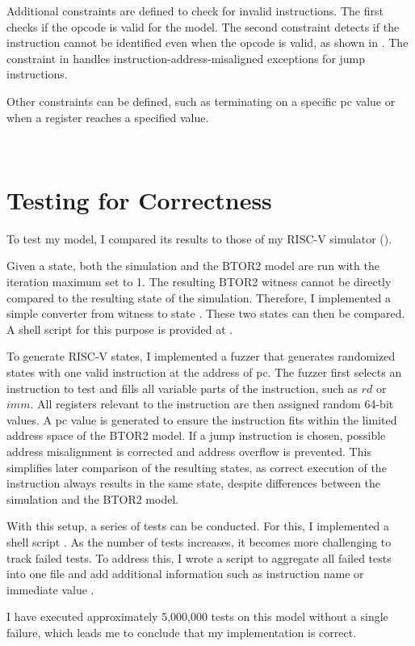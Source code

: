 Additional constraints are defined to check for invalid instructions.
The first checks if the opcode is valid for the model. The second
constraint detects if the instruction cannot be identified even when
the opcode is valid, as shown in . The
constraint in  handles
instruction-address-misaligned exceptions for jump instructions.

Other constraints can be defined, such as terminating on a specific
pc value or when a register reaches a specified value.

\\ 





\section{Testing for Correctness}\label{sec:corectness}
To test my model, I compared its results to those of my RISC-V
simulator ().

Given a state, both the simulation and the BTOR2 model are run with
the iteration maximum set to 1. The resulting BTOR2 witness cannot be
directly compared to the resulting state of the simulation.
Therefore, I implemented a simple converter from witness to state
\cite[src/restate\_witness.c]{repoRV2BTOR}. These two states can then
be compared. A shell script for this purpose is provided at
\cite[sh\_utils/compare\_iterations.sh]{repoRV2BTOR}.

To generate RISC-V states, I implemented a fuzzer
\cite[src/state\_fuzzer.c]{repoRV2BTOR} that generates randomized
states with one valid instruction at the address of pc. The fuzzer
first selects an instruction to test and fills all variable parts of
the instruction, such as $rd$ or $imm$. All registers relevant to the
instruction are then assigned random 64-bit values. A pc value is
generated to ensure the instruction fits within the limited address
space of the BTOR2 model. If a jump instruction is chosen, possible
address misalignment is corrected and address overflow is prevented.
This simplifies later comparison of the resulting states, as correct
execution of the instruction always results in the same state,
despite differences between the simulation and the BTOR2 model.

With this setup, a series of tests can be conducted. For this, I
implemented a shell script
\cite[sh\_utils/test\_btor2\_model.sh]{repoRV2BTOR}. As the number of
tests increases, it becomes more challenging to track failed tests.
To address this, I wrote a script to aggregate all failed tests into
one file and add additional information such as instruction name or
immediate value \cite[sh\_utils/diff\_logger.sh]{repoRV2BTOR}.

I have executed approximately 5,000,000 tests on this model without a
single failure, which leads me to conclude that my implementation is
correct.
